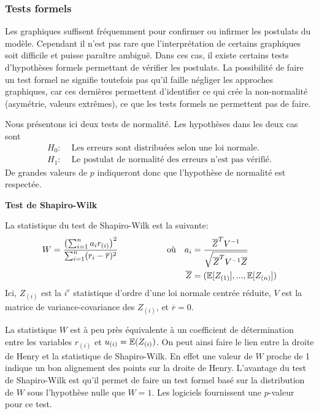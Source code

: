 \vspace{-0.1in}
\subsubsection{Tests formels}

Les graphiques suffisent fréquemment pour confirmer ou infirmer les postulats du modèle. Cependant il n'est pas rare que l'interprétation de certains graphiques soit difficile et puisse paraître ambiguë. Dans ces cas, il existe certains tests d'hypothèses formels permettant de vérifier les postulats. La possibilité de faire un test formel ne signifie toutefois pas qu'il faille négliger les approches graphiques, car ces dernières permettent d'identifier ce qui crée la non-normalité (asymétrie, valeurs extrêmes), ce que les tests formels ne permettent pas de faire.


\newpage
Nous présentons ici deux tests de normalité. Les hypothèses dans les deux cas sont
\begin{align*}
H_0: & \mbox{ Les erreurs sont distribuées selon une loi normale.}\\
H_1: & \mbox{ Le postulat de normalité des erreurs n'est pas vérifié.}
\end{align*}
De grandes valeurs de $p$ indiqueront donc que l'hypothèse de normalité est respectée.

\textbf{Test de Shapiro-Wilk}

La statistique du test de Shapiro-Wilk est la suivante:
\begin{align*}
 W= \frac{\left(\sum_{i=1}^n a_i r_{(i)} \right)^2}{\sum_{i=1}^n (r_i-\overline{r})^2} & \hspace{2cm} \mbox{où} & a_i &= \frac{\overline{Z}^T V^{-1}}{\sqrt{\overline{Z}^T V^{-1}\overline{Z}}}\\
 & &\overline{Z} &= (\mathbb{E}[Z_{(1)}],...,\mathbb{E}[Z_{(n)}])
\end{align*}
Ici, $Z_{(i)}$ est la $i^e$ statistique d'ordre d'une loi normale centrée réduite, $V$ est la matrice de variance-covariance des $Z_{(i)}$, et $\overline r=0$.

La statistique $W$ est à peu près équivalente à un coefficient de détermination entre les variables $r_{(i)}$ et $u_{(i)} = \mathbb{E}(Z_{(i)})$. On peut ainsi faire le lien entre la droite de Henry et la statistique de Shapiro-Wilk. En effet une valeur de $W$ proche de 1 indique un bon alignement des points sur la droite de Henry. L'avantage du test de Shapiro-Wilk est qu'il permet de faire un test formel basé sur la distribution de $W$ sous l'hypothèse nulle que $W=1$. Les logiciels fournissent une $p$-valeur pour ce test.

